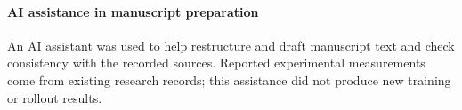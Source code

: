 \paragraph{AI assistance in manuscript preparation}
An AI assistant was used to help restructure and draft manuscript text and
check consistency with the recorded sources. Reported experimental
measurements come from existing research records; this assistance did not
produce new training or rollout results.

